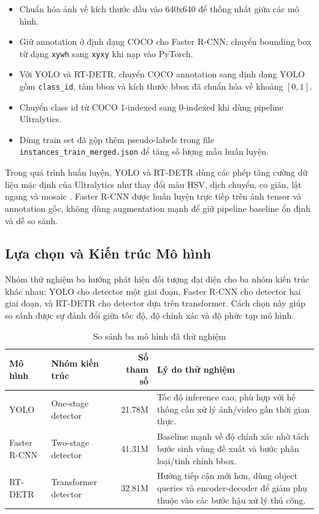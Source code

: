 \begin{itemize}
    \item Chuẩn hóa ảnh về kích thước đầu vào 640x640 để thống nhất giữa các mô hình.
    \item Giữ annotation ở định dạng COCO cho Faster R-CNN; chuyển bounding box từ dạng \texttt{xywh} sang \texttt{xyxy} khi nạp vào PyTorch.
    \item Với YOLO và RT-DETR, chuyển COCO annotation sang định dạng YOLO gồm \texttt{class\_id}, tâm bbox và kích thước bbox đã chuẩn hóa về khoảng $[0,1]$.
    \item Chuyển class id từ COCO 1-indexed sang 0-indexed khi dùng pipeline Ultralytics.
    \item Dùng train set đã gộp thêm pseudo-labels trong file \texttt{instances\_train\_merged.json} để tăng số lượng mẫu huấn luyện.
\end{itemize}

Trong quá trình huấn luyện, YOLO và RT-DETR dùng các phép tăng cường dữ liệu mặc định của Ultralytics như thay đổi màu HSV, dịch chuyển, co giãn, lật ngang và mosaic \cite{ultralytics}. Faster R-CNN được huấn luyện trực tiếp trên ảnh tensor và annotation gốc, không dùng augmentation mạnh để giữ pipeline baseline ổn định và dễ so sánh.

\subsection{Lựa chọn và Kiến trúc Mô hình}

Nhóm thử nghiệm ba hướng phát hiện đối tượng đại diện cho ba nhóm kiến trúc khác nhau: YOLO cho detector một giai đoạn, Faster R-CNN cho detector hai giai đoạn, và RT-DETR cho detector dựa trên transformer. Cách chọn này giúp so sánh được sự đánh đổi giữa tốc độ, độ chính xác và độ phức tạp mô hình.

\begin{table}[H]
    \centering
    \small
    \caption{So sánh ba mô hình đã thử nghiệm}
    \label{tab:model-selection-overview}
    \begin{tabularx}{\textwidth}{l l r X}
        \toprule
        \textbf{Mô hình} & \textbf{Nhóm kiến trúc} & \textbf{Số tham số} & \textbf{Lý do thử nghiệm} \\
        \midrule
        YOLO & One-stage detector & 21.78M & Tốc độ inference cao, phù hợp với hệ thống cần xử lý ảnh/video gần thời gian thực. \\
        Faster R-CNN & Two-stage detector & 41.31M & Baseline mạnh về độ chính xác nhờ tách bước sinh vùng đề xuất và bước phân loại/tinh chỉnh bbox. \\
        RT-DETR & Transformer detector & 32.81M & Hướng tiếp cận mới hơn, dùng object queries và encoder-decoder để giảm phụ thuộc vào các bước hậu xử lý thủ công. \\
        \bottomrule
    \end{tabularx}
\end{table}

